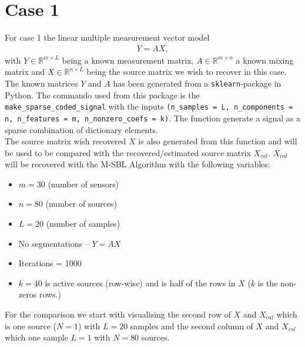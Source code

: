 \section{Case 1}
For case 1 the linear multiple measurement vector model
\begin{align*}
Y = AX,
\end{align*}
with $Y \in \mathbb{R}^{m \times L}$ being a known measurement matrix, $A \in \mathbb{R}^{m \times n}$ a known mixing matrix and $X \in \mathbb{R}^{n \times L}$ being the source matrix we wish to recover in this case.
\\
The known matrices $Y$ and $A$ has been generated from a \texttt{sklearn}-package in Python. The commando used from this package is the \texttt{make\_sparse\_coded\_signal} with the inputs \texttt{(n\_samples = L, n\_components = n, n\_features = m, n\_nonzero\_coefs = k)}. The function generate a signal as a sparse combination of dictionary elements.
\\
The source matrix wish recovered $X$ is also generated from this function and will be used to be compared with the recovered/estimated source matrix $X_{cal}$. $X_{cal}$ will be recovered with the M-SBL Algorithm with the following variables: 
\begin{itemize}
\item $m = 30$ (number of sensors)
\item $n = 80$ (number of sources)
\item $L = 20$ (number of samples)
\item No segmentations -- $Y = AX$
\item Iterations = 1000
\item $k = 40$ is active sources (row-wise) and is half of the rows in $X$ ($k$ is the non-zeros rows.)   
\end{itemize}
For the comparison we start with visualising the second row of $X$ and $X_{cal}$ which is one source ($N=1$) with $L = 20$ samples and the second column of $X$ and $X_{cal}$ which one sample $L=1$ with $N = 80$ sources.
